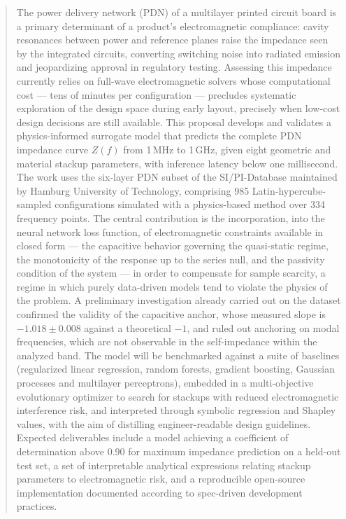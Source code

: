 \begin{abstract}

\noindent
The power delivery network (PDN) of a multilayer printed circuit board is a
primary determinant of a product's electromagnetic compliance: cavity
resonances between power and reference planes raise the impedance seen by the
integrated circuits, converting switching noise into radiated emission and
jeopardizing approval in regulatory testing. Assessing this impedance currently
relies on full-wave electromagnetic solvers whose computational cost --- tens of
minutes per configuration --- precludes systematic exploration of the design
space during early layout, precisely when low-cost design decisions are still
available. This proposal develops and validates a physics-informed surrogate
model that predicts the complete PDN impedance curve $Z(f)$ from 1\,MHz to
1\,GHz, given eight geometric and material stackup parameters, with inference
latency below one millisecond. The work uses the six-layer PDN subset of the
SI/PI-Database maintained by Hamburg University of Technology, comprising 985
Latin-hypercube-sampled configurations simulated with a physics-based method
over 334 frequency points. The central contribution is the incorporation, into
the neural network loss function, of electromagnetic constraints available in
closed form --- the capacitive behavior governing the quasi-static regime, the
monotonicity of the response up to the series null, and the passivity condition
of the system --- in order to compensate for sample scarcity, a regime in which
purely data-driven models tend to violate the physics of the problem. A
preliminary investigation already carried out on the dataset confirmed the
validity of the capacitive anchor, whose measured slope is
$-1.018 \pm 0.008$ against a theoretical $-1$, and ruled out anchoring on modal
frequencies, which are not observable in the self-impedance within the analyzed
band. The model will be benchmarked against a suite of baselines (regularized linear
regression, random forests, gradient boosting, Gaussian processes and multilayer
perceptrons), embedded in a multi-objective evolutionary optimizer to search for
stackups with reduced electromagnetic interference risk, and interpreted through
symbolic regression and Shapley values, with the aim of distilling
engineer-readable design guidelines. Expected deliverables include a model
achieving a coefficient of determination above 0.90 for maximum impedance
prediction on a held-out test set, a set of interpretable analytical expressions
relating stackup parameters to electromagnetic risk, and a reproducible
open-source implementation documented according to spec-driven development
practices.

\end{abstract}
